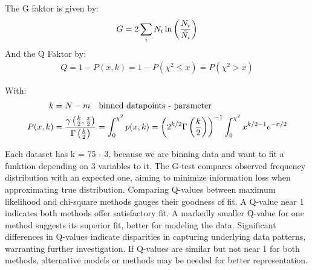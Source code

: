 The G faktor is given by:
\begin{align}
    G = 2\sum_i N_i \ln \left({\frac{N_i}{\Tilde{N_i}}}\right)
\end{align}
And the Q Faktor by:
\begin{align}
    Q = 1-P(x,k) = 1 -P(\chi^2 \leq x) = P(\chi^2>x) 
\end{align}

With:
\begin{align}
    k &= N-m \quad \text{binned datapoints - parameter}\\
    P(x,k) &= \frac{\gamma\left({\frac{k}{2},\frac{x}{2}}\right)}{\Gamma\left({\frac{k}{2}}\right)} = \int_0^{\chi^2} p(x,k) =  \left({2^{k/2}\Gamma\left( \frac{k}{2} \right)}\right)^{-1} \int_0^{\chi^2} x^{k/2-1}e^{-x/2}
\end{align}

Each dataset has k = 75 - 3, because we are binning data and want to fit a funktion depending on 3 variables to it.  
The G-test compares observed frequency distribution with an expected one, aiming to minimize information loss when approximating true distribution. Comparing Q-values between maximum likelihood and chi-square methods gauges their goodness of fit. A Q-value near 1 indicates both methods offer satisfactory fit. A markedly smaller Q-value for one method suggests its superior fit, better for modeling the data. Significant differences in Q-values indicate disparities in capturing underlying data patterns, warranting further investigation. If Q-values are similar but not near 1 for both methods, alternative models or methods may be needed for better representation.